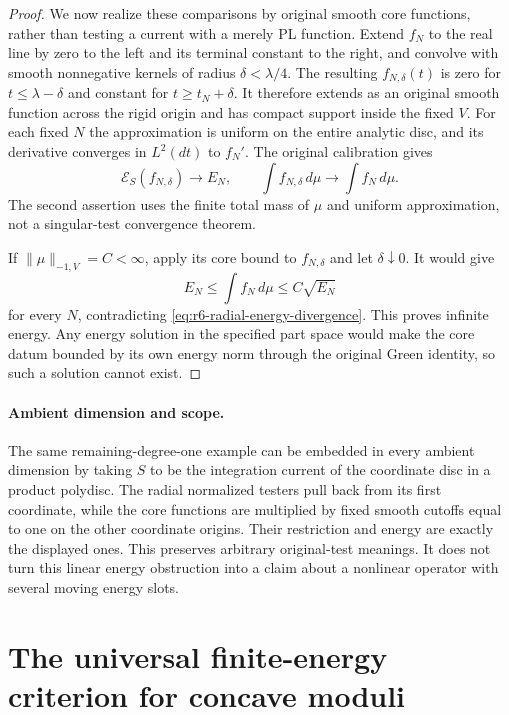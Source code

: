 \documentclass[11pt,a4paper]{article}
\numberwithin{equation}{section}
\theoremstyle{definition}
\theoremstyle{remark}
\begin{document}
\begin{proof}
We now realize these comparisons by original smooth core functions,
rather than testing a current with a merely PL function. Extend $f_N$
to the real line by zero to the left and its terminal constant to the
right, and convolve with smooth nonnegative kernels of radius
$\delta<\lambda/4$. The resulting $f_{N,\delta}(t)$ is zero for
$t\le\lambda-\delta$ and constant for $t\ge t_N+\delta$.
It therefore extends as an original smooth function across the rigid
origin and has compact support inside the fixed $V$. For each fixed
$N$ the approximation is uniform on the entire analytic disc, and
its derivative converges in $L^2(dt)$ to $f_N'$.
The original calibration gives
\[
 \mathcal E_S(f_{N,\delta})\longrightarrow E_N,
       \qquad \int f_{N,\delta}\,d\mu\longrightarrow\int f_N\,d\mu.
\]
The second assertion uses the finite total mass of $\mu$ and uniform
approximation, not a singular-test convergence theorem.

If $\|\mu\|_{-1,V}=C<\infty$, apply its core bound to
$f_{N,\delta}$ and let $\delta\downarrow0$. It would give
\[
                  E_N\le\int f_N\,d\mu\le C\sqrt{E_N}
\]
for every $N$, contradicting \eqref{eq:r6-radial-energy-divergence}.
This proves infinite energy. Any energy solution in the specified
part space would make the core datum bounded by its own energy norm
through the original Green identity, so such a solution cannot exist.
\end{proof}

\paragraph{Ambient dimension and scope.}
The same remaining-degree-one example can be embedded in every ambient
dimension by taking $S$ to be the integration current of the coordinate
disc in a product polydisc. The radial normalized testers pull back
from its first coordinate, while the core functions are multiplied by
fixed smooth cutoffs equal to one on the other coordinate origins.
Their restriction and energy are exactly the displayed ones.
This preserves arbitrary original-test meanings. It does not turn this
linear energy obstruction into a claim about a nonlinear operator with
several moving energy slots.



\section{The universal finite-energy criterion for concave moduli}
\label{sec:r6-concave-modulus-threshold}
\end{document}
